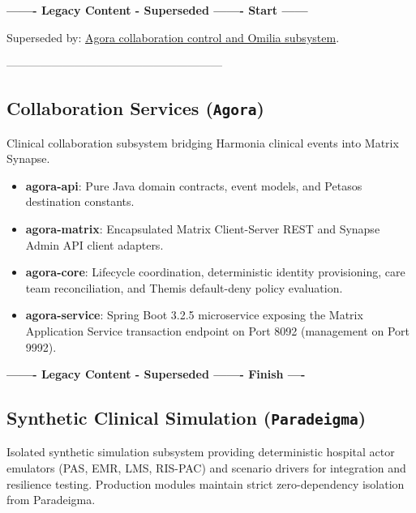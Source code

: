 \par\noindent\textbf{------- Legacy Content - Superseded ------- Start ------}
\par\noindent Superseded by: \href{../../markdown/05-information-systems-architecture/agora-omilia-collaboration.md\#control-and-operations}{Agora collaboration control and Omilia subsystem}.
\par\noindent ---------------------------------------------------------

\subsection{Collaboration Services (\texttt{Agora})}
Clinical collaboration subsystem bridging Harmonia clinical events into Matrix Synapse.
\begin{itemize}
    \item \textbf{agora-api}: Pure Java domain contracts, event models, and Petasos destination constants.
    \item \textbf{agora-matrix}: Encapsulated Matrix Client-Server REST and Synapse Admin API client adapters.
    \item \textbf{agora-core}: Lifecycle coordination, deterministic identity provisioning, care team reconciliation, and Themis default-deny policy evaluation.
    \item \textbf{agora-service}: Spring Boot 3.2.5 microservice exposing the Matrix Application Service transaction endpoint on Port 8092 (management on Port 9992).
\end{itemize}


\par\noindent\textbf{------- Legacy Content - Superseded ------- Finish ----}

\subsection{Synthetic Clinical Simulation (\texttt{Paradeigma})}
Isolated synthetic simulation subsystem providing deterministic hospital actor emulators (PAS, EMR, LMS, RIS-PAC) and scenario drivers for integration and resilience testing. Production modules maintain strict zero-dependency isolation from Paradeigma.

\newpage

